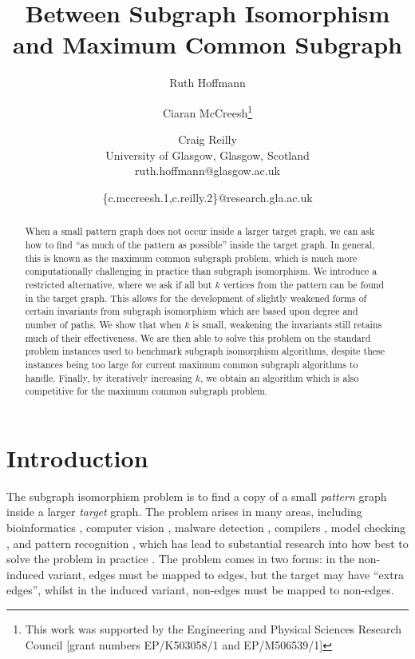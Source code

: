 \documentclass[letterpaper]{article}
\title{Between Subgraph Isomorphism and Maximum Common Subgraph}
\author{Ruth Hoffmann \and Ciaran McCreesh\thanks{This work was supported by the Engineering and
Physical Sciences Research Council [grant numbers EP/K503058/1 and EP/M506539/1]} \and Craig
Reilly\samethanks \\ University of Glasgow, Glasgow, Scotland \\ ruth.hoffmann@glasgow.ac.uk \and
\{c.mccreesh.1,c.reilly.2\}@research.gla.ac.uk}
\newcommand{\citep}[1]{\cite{#1}}
\theoremstyle{definition}
\begin{document}
\maketitle

\begin{abstract}
    When a small pattern graph does not occur inside a larger target graph, we can ask how to find
    ``as much of the pattern as possible'' inside the target graph. In general, this is known as the maximum
    common subgraph problem, which is much more computationally challenging in practice than
    subgraph isomorphism. We introduce a restricted alternative, where we ask if all but $k$
    vertices from the pattern can be found in the target graph. This allows for the development of
    slightly weakened forms of certain invariants from subgraph isomorphism which are based upon degree and
    number of paths.  We show that when $k$ is small, weakening the invariants still retains much of
    their effectiveness. We are then able to solve this problem on the standard problem
    instances used to benchmark subgraph isomorphism algorithms, despite these instances being
    too large for current maximum common subgraph algorithms to handle. Finally, by iteratively
    increasing $k$, we obtain an algorithm which is also competitive for the maximum common subgraph
    problem.
\end{abstract}

\section{Introduction}

The subgraph isomorphism problem is to find a copy of a small \emph{pattern} graph inside a larger
\emph{target} graph. The problem arises in many areas, including bioinformatics
\citep{Bonnici:2013}, computer vision \citep{cviu11,pr15}, malware detection
\citep{DBLP:conf/dimva/BruschiMM06}, compilers
\citep{DBLP:conf/cgo/MurrayF12,DBLP:conf/cp/BlindellLCS15}, model checking \cite{Sevegnani:2015}, and pattern recognition
\citep{Conte:2004}, which has lead to substantial research into how best to solve the problem in
practice \cite[and
more]{mcgregor79,Ullman,Cordella:2004,DBLP:journals/ai/Solnon10,DBLP:conf/cp/AudemardLMGP14,DBLP:conf/cp/McCreeshP15}.
The problem comes in two forms: in the non-induced variant, edges must be mapped to edges, but the
target may have ``extra edges'', whilst in the induced variant, non-edges must be mapped to
non-edges.
\end{document}
